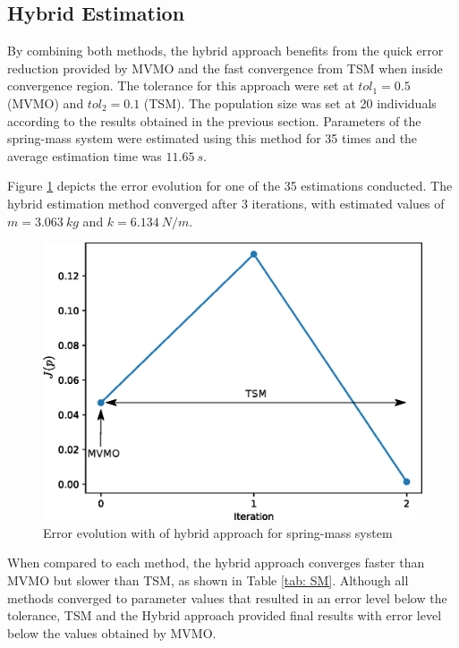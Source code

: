 \subsection{Hybrid Estimation}

By combining both methods, the hybrid approach benefits from the quick error reduction provided by MVMO and the fast convergence from TSM when inside convergence region. The tolerance for this approach were set at $tol_{1} = 0.5$ (MVMO) and $tol_{2} = 0.1$ (TSM). The population size was set at 20 individuals according to the results obtained in the previous section. Parameters of the spring-mass system were estimated using this method for 35 times and the average estimation time was $11.65\ s$.

Figure \ref{fig: Hybrid_conv} depicts the error evolution for one of the 35 estimations conducted. The hybrid estimation method converged after 3 iterations, with estimated values of $m=3.063\ kg$ and $k=6.134\ N/m$.

\begin{figure}[h]
	\caption{Error evolution with of hybrid approach for spring-mass system}
	\begin{center}
		\includegraphics[scale=0.7]{Images/Hybrid_conv_.eps}
	\end{center}
	\label{fig: Hybrid_conv}
\end{figure}

When compared to each method, the hybrid approach converges faster than MVMO but slower than TSM, as shown in Table \ref{tab: SM}. Although all methods converged to parameter values that resulted in an error level below the tolerance, TSM and the Hybrid approach provided final results with error level below the values obtained by MVMO.

